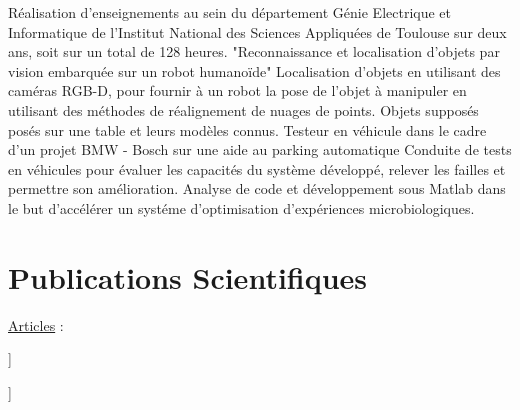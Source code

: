 \documentclass[11pt,a4paper,sans]{moderncv}         %
\begin{document}
{}{
  R\'ealisation d'enseignements au sein du d\'epartement G\'enie Electrique et Informatique de l'Institut National des Sciences Appliqu\'ees de Toulouse sur deux ans, soit sur un total de 128 heures.
}
%
{"Reconnaissance et localisation d'objets par vision embarqu\'ee sur un robot humano\"ide"}{
  Localisation d'objets en utilisant des cam\'eras RGB-D, pour fournir \`a un robot la pose de l'objet \`a manipuler en utilisant des m\'ethodes de r\'ealignement de nuages de points.
Objets suppos\'es pos\'es sur une table et leurs mod\`eles connus.
}
%
{Testeur en v\'ehicule dans le cadre d'un projet BMW - Bosch sur une aide au parking automatique}{
  Conduite de tests en v\'ehicules pour \'evaluer les capacit\'es du syst\`eme d\'evelopp\'e, relever les failles et permettre son am\'elioration.
}
%
{Analyse de code et d\'eveloppement sous Matlab dans le but d'acc\'el\'erer un syst\'eme d'optimisation d'exp\'eriences microbiologiques.
}

\section{Publications Scientifiques}
\toggletrue{myrefs}
\large{\underline{Articles} :}
\begin{itemize}%
\normalsize{\item[[1]\hspace{-2mm}]} \normalsize{}
\normalsize{\item[[2]\hspace{-2mm}]} \normalsize{}
\end{itemize}
\end{document}

